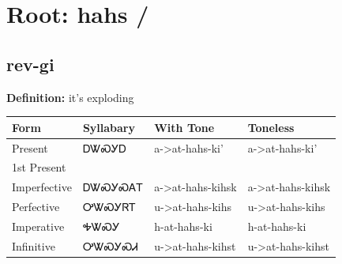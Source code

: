 \documentclass{article}%
\begin{document}
%
\normalsize%
\section*{Root: hahs / }%
\subsection*{rev-gi}%
\textbf{Definition: }%
it’s exploding%
\\[0.5em]%
\begin{tabular}{|l|l|l|l|}%
\hline%
\textbf{Form}&\textbf{Syllabary}&\textbf{With Tone}&\textbf{Toneless}\\%
\hline%
Present&ᎠᏔᏍᎩᎠ&a{-}>at{-}hahs{-}ki'&a{-}>at{-}hahs{-}ki'\\%
1st Present&&&\\%
Imperfective&ᎠᏔᏍᎩᏍᎪᎢ&a{-}>at{-}hahs{-}kihsk&a{-}>at{-}hahs{-}kihsk\\%
Perfective&ᎤᏔᏍᎩᏒᎢ&u{-}>at{-}hahs{-}kihs&u{-}>at{-}hahs{-}kihs\\%
Imperative&ᎭᏔᏍᎩ&h{-}at{-}hahs{-}ki&h{-}at{-}hahs{-}ki\\%
Infinitive&ᎤᏔᏍᎩᏍᏗ&u{-}>at{-}hahs{-}kihst&u{-}>at{-}hahs{-}kihst\\%
\hline%
\end{tabular}%
\\[1em]%
\end{document}
